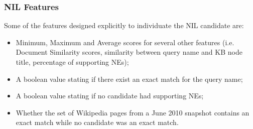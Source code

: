 \documentclass[a4paper,11pt]{report}
\begin{document}
\subsubsection{NIL Features}
Some of the features designed explicitly to individuate the NIL candidate are:
\begin{itemize}
\item Minimum, Maximum and Average scores for several other features (i.e. Document Similarity scores, similarity between query name and KB node title, percentage of supporting NEs);
\item A boolean value stating if there exist an exact match for the query name;
\item A boolean value stating if no candidate had supporting NEs;
\item Whether the set of Wikipedia pages from a June 2010 snapshot contains an exact match while no candidate was an exact match.
\end{itemize}
\end{document}
